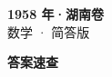 \documentclass[zihao=-4, a4paper]{ctexart}
\begin{document}
\begin{center}
  {\Large\bfseries 1958 年·湖南卷}\\[4pt]
  {\large 数学 · 简答版}
\end{center}
\medskip
{}

\clearpage
{}
\begin{center}{\Large\bfseries 答案速查}\end{center}
\medskip

\end{document}
